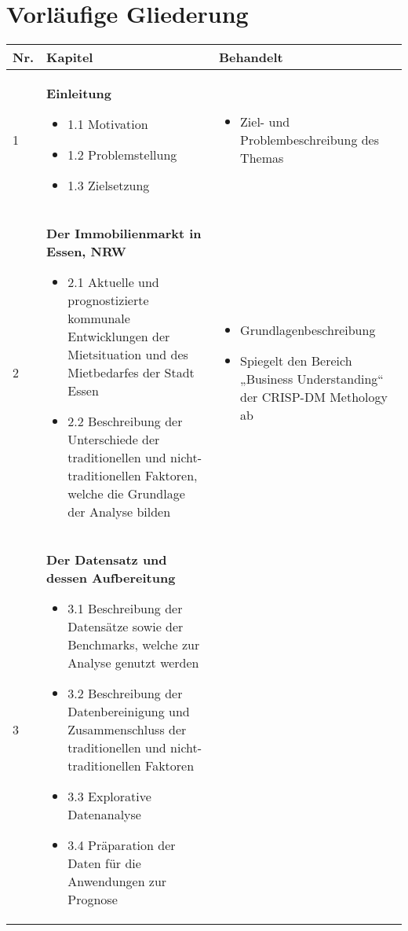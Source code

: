 \newpage
\section{Vorläufige Gliederung}

\begin{table}[H]
    \begin{tabularx}{\textwidth}[ht]{|l|X|X|}
      \hline
      \textbf{Nr.} & \textbf{Kapitel} & \textbf{Behandelt}\\
      \hline
      \hline
        1 & \textbf{Einleitung}

        \begin{itemize}
            \item 1.1 Motivation
            \item 1.2 Problemstellung
            \item 1.3 Zielsetzung
        \end{itemize} 
        
        & \begin{itemize}
            \item Ziel- und Problembeschreibung des Themas
        \end{itemize}\\
        \hline\hline
        2 & \textbf{Der Immobilienmarkt in Essen, NRW} 
        
        \begin{itemize}
            \item 2.1 Aktuelle und prognostizierte kommunale Entwicklungen der Mietsituation 
            und des Mietbedarfes der Stadt Essen
            \item 2.2 Beschreibung der Unterschiede der traditionellen und 
            nicht-traditionellen Faktoren, welche die Grundlage der Analyse bilden
        \end{itemize}

        & \begin{itemize}
            \item Grundlagenbeschreibung
            \item Spiegelt den Bereich „Business Understanding“ der CRISP-DM Methology ab
        \end{itemize}\\
        \hline\hline
        3 & \textbf{Der Datensatz und dessen Aufbereitung} 
        
        \begin{itemize}
            \item 3.1 Beschreibung der Datensätze sowie der Benchmarks, welche zur 
            Analyse genutzt werden
            \item 3.2 Beschreibung der Datenbereinigung und Zusammenschluss der 
            traditionellen und nicht-traditionellen Faktoren
            \item 3.3 Explorative Datenanalyse
            \item 3.4 Präparation der Daten für die Anwendungen zur Prognose
        \end{itemize}
        

\end{tabularx}
\end{table}
